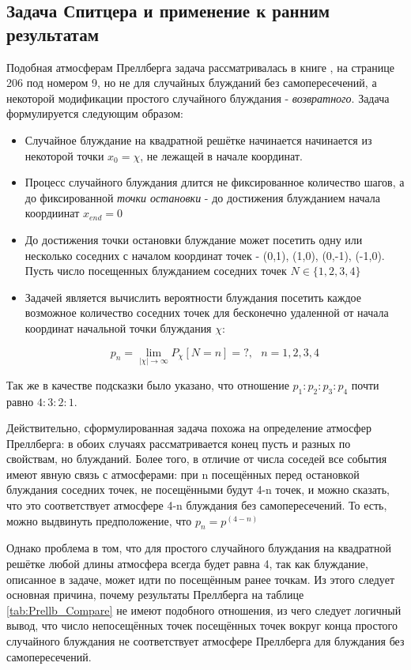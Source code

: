 \subsection{Задача Спитцера и применение к ранним результатам}

Подобная атмосферам Преллберга задача рассматривалась в книге \cite{Spitser1969}, на странице 206 под номером 9, но не для случайных блужданий без самопересечений, а некоторой модификации простого случайного блуждания - \textit{возвратного}. Задача формулируется следующим образом:

\begin{itemize}
    \item Случайное блуждание на квадратной решётке начинается начинается из некоторой точки $x_0 = \chi$, не лежащей в начале координат.
    \item Процесс случайного блуждания длится не фиксированное количество шагов, а до фиксированной \textit{точки остановки} - до достижения блужданием начала коордиинат $x_{end} = 0$
    \item До достижения точки остановки блуждание может посетить одну или несколько соседних с началом координат точек - (0,1), (1,0), (0,-1), (-1,0). Пусть число посещенных блужданием соседних точек  $N \in \{1, 2, 3, 4\}$
    \item Задачей является вычислить вероятности блуждания посетить каждое возможное количество соседних точек для бесконечно удаленной от начала координат начальной точки блуждания $\chi$:
    
    \[ p_{n} = \lim_{|\chi|\to \infty} P_{\chi}[N = n] = ?,\ \ \ n = 1, 2, 3, 4\]
\end{itemize}

Так же в качестве подсказки было указано, что отношение $p_1:p_2:p_3:p_4$ почти равно $4:3:2:1$.

Действительно, сформулированная задача похожа на определение атмосфер Преллберга: в обоих случаях рассматривается конец пусть и разных по свойствам, но блужданий. Более того, в отличие от числа соседей все события имеют явную связь с атмосферами: при n посещённых перед остановкой блуждания соседних точек, не посещёнными будут 4-n точек, и можно сказать, что это соответствует атмосфере 4-n блуждания без самопересечений. То есть, можно выдвинуть предположение, что $p_n = p^{(4-n)}$

Однако проблема в том, что для простого случайного блуждания на квадратной решётке любой длины атмосфера всегда будет равна 4, так как блуждание, описанное в задаче, может идти по посещённым ранее точкам. Из этого следует основная причина, почему результаты Преллберга на таблице \ref{tab:Prellb_Compare} не имеют подобного отношения, из чего следует логичный вывод, что число непосещённых точек посещённых точек вокруг конца простого случайного блуждания не соответствует атмосфере Преллберга для блуждания без самопересечений.

